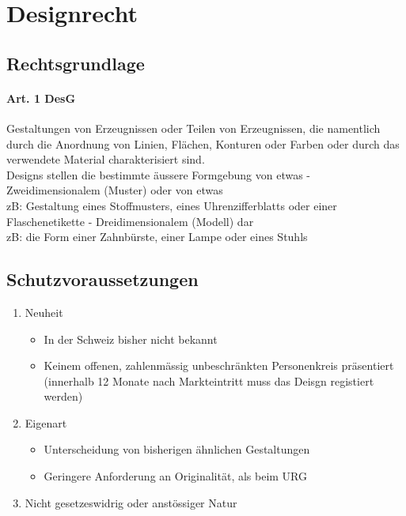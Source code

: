 \section{Designrecht}

\subsection{Rechtsgrundlage}
\label{sec:Designrecht-Grundlage}

\paragraph{Art. 1 DesG}
Gestaltungen von Erzeugnissen oder Teilen von Erzeugnissen, die namentlich durch die Anordnung von Linien, Flächen, Konturen oder Farben oder durch das verwendete Material charakterisiert sind.\\

Designs stellen die bestimmte äussere Formgebung von etwas -
Zweidimensionalem (Muster) oder von etwas\\
zB: Gestaltung eines Stoffmusters, eines Uhrenzifferblatts oder einer
Flaschenetikette - Dreidimensionalem (Modell) dar\\
zB: die Form einer Zahnbürste, einer Lampe oder eines Stuhls


\subsection{Schutzvoraussetzungen}

\begin{enumerate}
	\tightlist
	\item Neuheit
	\begin{itemize}
		\tightlist
		\item In der Schweiz bisher nicht bekannt
		\item Keinem offenen, zahlenmässig unbeschränkten Personenkreis
		präsentiert (innerhalb 12 Monate nach Markteintritt muss das Deisgn
		registiert werden)
	\end{itemize}
	\item Eigenart
	\begin{itemize}
		\tightlist
		\item Unterscheidung von bisherigen ähnlichen Gestaltungen
		\item Geringere Anforderung an Originalität, als beim URG
	\end{itemize}
	\item Nicht gesetzeswidrig oder anstössiger Natur
\end{enumerate}


